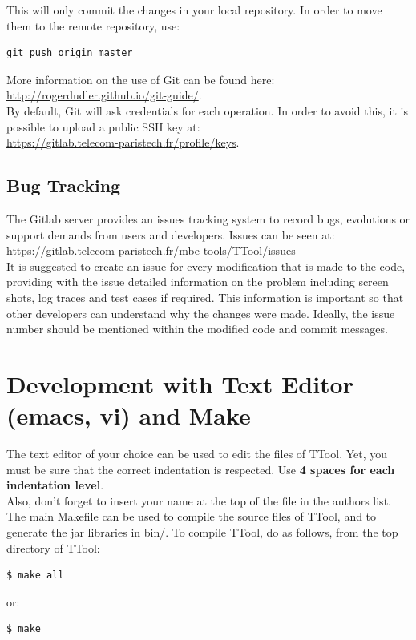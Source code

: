 \documentclass[12pt]{article}
\begin{document}
This will only commit the changes in your local repository. In order to move them to the remote repository, use:

\begin{verbatim}
git push origin master
\end{verbatim}

More information on the use of Git can be found here: \\
\url{http://rogerdudler.github.io/git-guide/}. \\

By default, Git will ask credentials for each operation. In order to avoid this,
it is possible to upload a public SSH key at: \\
\url{https://gitlab.telecom-paristech.fr/profile/keys}.

\subsection{Bug Tracking}

The Gitlab server provides an issues tracking system to record bugs, evolutions
or support demands from users and developers. Issues can be seen at: \\
\url{https://gitlab.telecom-paristech.fr/mbe-tools/TTool/issues} \\

It is suggested to create an issue for every modification that is made to the
code, providing with the issue detailed information on the problem including
screen shots, log traces and test cases if required. This information is
important so that other developers can understand why the changes were made.
Ideally, the issue number should be mentioned within the modified code and
commit messages.  \\

\section{Development with Text Editor (emacs, vi) and Make}

The text editor of your choice can be used to edit the files of TTool. Yet, you must be sure that the correct indentation is respected. Use \textbf{4 spaces for each indentation level}.\\

Also, don't forget to insert your name at the top of the file in the authors list.\\

The main Makefile can be used to compile the source files of TTool, and to generate the jar libraries in bin/.
To compile TTool, do as follows, from the top directory of TTool:
\begin{verbatim}
$ make all
\end{verbatim}
or:
\begin{verbatim}
$ make
\end{verbatim}
\end{document}
